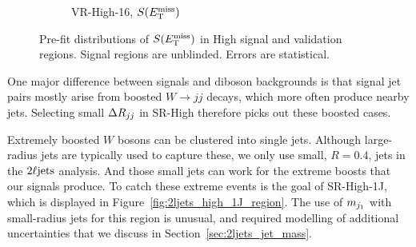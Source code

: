 \begin{figure}[tp]
\begin{subfigure}{0.48\textwidth}
\caption{VR-High-16, $\metsig$}
\end{subfigure}
\caption[
Pre-fit distributions of $\metsig$ in High signal and validation regions
]{%
Pre-fit distributions of $\metsig$ in High signal and validation regions.
Signal regions are unblinded.
Errors are statistical.
}
\label{fig:2ljets_high_region}
\end{figure}

One major difference between signals and diboson backgrounds is that signal
jet pairs mostly arise from boosted $W\rightarrow jj$ decays, which more often
produce nearby jets.
Selecting small $\Delta R_{jj}$ in SR-High therefore picks out these boosted cases.

Extremely boosted $W$ bosons can be clustered into single jets.
Although large-radius jets are typically used to capture these, we only use
small, $R=0.4$, jets in the $2\ell\mathrm{jets}$ analysis.
And those small jets can work for the extreme boosts that our signals produce.
To catch these extreme events is the goal of SR-High-1J, which is displayed
in Figure~\ref{fig:2ljets_high_1J_region}.
The use of $m_{j_1}$ with small-radius jets for this region is unusual,
and required modelling of additional uncertainties that we discuss in
Section~\ref{sec:2ljets_jet_mass}.

